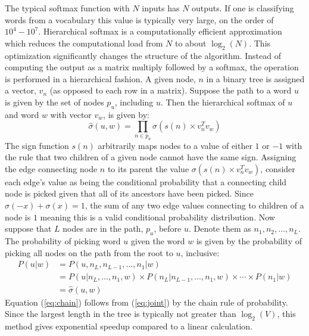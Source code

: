 The typical softmax function with $N$ inputs has $N$ outputs.  If one is classifying words from a vocabulary this value is typically very large, on the order of $10^4 - 10^7$.  Hierarchical softmax is a computationally efficient approximation which reduces the computational load from $N$ to about $\log_2(N)$.  This optimization significantly changes the structure of the algorithm.  Instead of computing the output as a matrix multiply followed by a softmax, the operation is performed in a hierarchical fashion.  A given node, $n$ in a binary tree is assigned a vector, $v_n$ (as opposed to each row in a matrix).  Suppose the path to a word $u$ is given by the set of nodes $p_u$, including $u$.  Then the hierarchical softmax of $u$ and word $w$ with vector $v_w$, is given by:
\begin{equation}\label{eq:hierarchical_softmax}
\hat{\sigma}(u,w) = \prod_{n\in p_u} \sigma (s(n)\times v_n^Tv_w)
\end{equation}
The sign function $s(n)$ arbitrarily maps nodes to a value of either $1$ or $-1$ with the rule that two children of a given node cannot have the same sign.  Assigning the edge connecting node $n$ to its parent the value $\sigma (s(n)\times v_n^Tv_w)$, consider each edge's value as being the conditional probability that a connecting child node is picked given that all of its ancestors have been picked.  Since $\sigma(-x) + \sigma(x) = 1$, the sum of any two edge values connecting to children of a node is $1$ meaning this is a valid conditional probability distribution.  Now suppose that $L$ nodes are in the path, $p_u$, before $u$.  Denote them as $n_1,n_2,\dots,n_L$.  The probability of picking word $u$ given the word $w$ is given by the probability of picking all nodes on the path from the root to $u$, inclusive:
\begin{align}
P(u|w) \label{eq:joint} &=P(u,n_L,n_{L-1},\dots,n_1|w)\\ \label{eq:chain}
&=P(u|n_L,\dots,n_1,w)\times P(n_L|n_{L-1},\dots,n_1,w)\times \cdots \times P(n_1|w)\\
&=\hat{\sigma}(u,w)
\end{align}
Equation (\ref{eq:chain}) follows from (\ref{eq:joint}) by the chain rule of probability.  Since the largest length in the tree is typically not greater than $\log_2(V)$, this method gives exponential speedup compared to a linear calculation.

